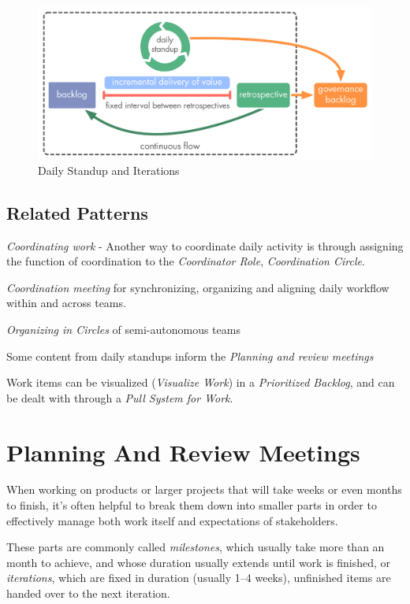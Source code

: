 \begin{figure}[htbp]
\centering
\includegraphics[keepaspectratio,width=\textwidth,height=0.75\textheight]{img/meetings/continuous-flow.png}
\caption{Daily Standup and Iterations}
\end{figure}

\subsection{Related Patterns}
\label{relatedpatterns}

\emph{Coordinating work} - Another way to coordinate daily activity is through assigning the function of coordination to the \emph{Coordinator Role}, \emph{Coordination Circle}.

\emph{Coordination meeting} for synchronizing, organizing and aligning daily workflow within and across teams.

\emph{Organizing in Circles} of semi-autonomous teams

Some content from daily standups inform the \emph{Planning and review meetings}

Work items can be visualized (\emph{Visualize Work}) in a \emph{Prioritized Backlog}, and can be dealt with through a \emph{Pull System for Work}.

\section{Planning And Review Meetings}
\label{planningandreviewmeetings}

When working on products or larger projects that will take weeks or even months to finish, it's often helpful to break them down into smaller parts in order to effectively manage both work itself and expectations of stakeholders.

These parts are commonly called \emph{milestones}, which usually take more than an month to achieve, and whose duration usually extends until work is finished, or \emph{iterations}, which are fixed in duration (usually 1--4 weeks), unfinished items are handed over to the next iteration.

